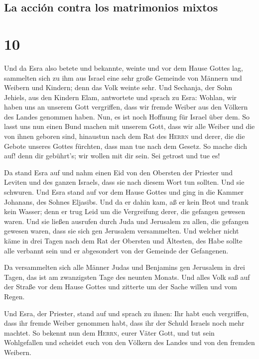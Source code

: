 \hypertarget{la-acciuxf3n-contra-los-matrimonios-mixtos}{%
\subsection{La acción contra los matrimonios
mixtos}\label{la-acciuxf3n-contra-los-matrimonios-mixtos}}

\hypertarget{section-9}{%
\section{10}\label{section-9}}

 Und da Esra also betete und bekannte, weinte und vor dem
Hause Gottes lag, sammelten sich zu ihm aus Israel eine sehr große
Gemeinde von Männern und Weibern und Kindern; denn das Volk weinte sehr.
 Und Sechanja, der Sohn Jehiels, aus den Kindern Elam,
antwortete und sprach zu Esra: Wohlan, wir haben uns an unserem Gott
vergriffen, dass wir fremde Weiber aus den Völkern des Landes genommen
haben. Nun, es ist noch Hoffnung für Israel über dem.  So
lasst uns nun einen Bund machen mit unserem Gott, dass wir alle Weiber
und die von ihnen geboren sind, hinaustun nach dem Rat des
\textsc{Herrn} und derer, die die Gebote unseres Gottes fürchten, dass
man tue nach dem Gesetz.  So mache dich auf! denn dir
gebührt's; wir wollen mit dir sein. Sei getrost und tue es!

 Da stand Esra auf und nahm einen Eid von den Obersten der
Priester und Leviten und des ganzen Israels, dass sie nach diesem Wort
tun sollten. Und sie schwuren.  Und Esra stand auf vor dem
Hause Gottes und ging in die Kammer Johanans, des Sohnes Eljasibs. Und
da er dahin kam, aß er kein Brot und trank kein Wasser; denn er trug
Leid um die Vergreifung derer, die gefangen gewesen waren.
 Und sie ließen ausrufen durch Juda und Jerusalem zu
allen, die gefangen gewesen waren, dass sie sich gen Jerusalem
versammelten.  Und welcher nicht käme in drei Tagen nach
dem Rat der Obersten und Ältesten, des Habe sollte alle verbannt sein
und er abgesondert von der Gemeinde der Gefangenen.

 Da versammelten sich alle Männer Judas und Benjamins gen
Jerusalem in drei Tagen, das ist am zwanzigsten Tage des neunten Monats.
Und alles Volk saß auf der Straße vor dem Hause Gottes und zitterte um
der Sache willen und vom Regen.

 Und Esra, der Priester, stand auf und sprach zu ihnen:
Ihr habt euch vergriffen, dass ihr fremde Weiber genommen habt, dass ihr
der Schuld Israels noch mehr machtet.  So bekennt nun dem
\textsc{Herrn}, eurer Väter Gott, und tut sein Wohlgefallen und scheidet
euch von den Völkern des Landes und von den fremden Weibern.

